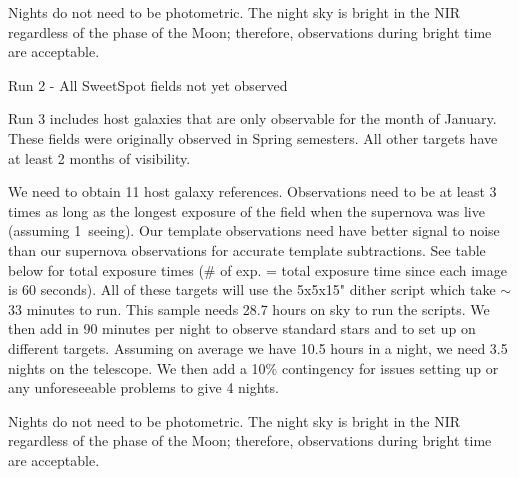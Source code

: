 \documentclass[11pt]{article}
\begin{document}
Nights do not need to be photometric. 
The night sky is bright in the NIR regardless of the phase of the Moon; therefore, observations during bright time are acceptable. 

\begin{configuration}
\grating{}
\order{}
\crossdisperser{}
\slit{}
\multislit{}
\wstart{}
\wend{}
\cable{}
\corrector{}
\collimator{}
\adc{}
\end{configuration}
\specialrequest    %
\begin{targettable}{Run 2 - All SweetSpot fields not yet observed}
\objid{}           %
\object{}          %
\ra{}              %
\dec{}             %
\epoch{}           %
\magnitude{}
\filter{}
\exptime{}         %
\nexposures{}      %
\moondays{}        %
\skycond{}         %
\seeing{}          %
\obscomment{}      %
\end{targettable}

\technicaldescription

Run 3 includes host galaxies that are only observable for the month of January. 
These fields were originally observed in Spring semesters. All other targets have at least 2 months of visibility.

We need to obtain 11 host galaxy references. 
Observations need to be at least 3 times as long as the longest exposure of the field when the supernova was live (assuming 1\arcsec\ seeing).
Our template observations need have better signal to noise than our supernova observations for accurate template subtractions. 
See table below for total exposure times ($\#$ of exp. = total exposure time since each image is 60 seconds).
All of these targets will use the 5x5x15" dither script which take $\sim$ 33 minutes to run. 
This sample needs 28.7 hours on sky to run the scripts. 
We then add in 90 minutes per night to observe standard stars and to set up on different targets. 
Assuming on average we have 10.5 hours in a night, we need 3.5 nights on the telescope. 
We then add a 10$\%$ contingency for issues setting up or any unforeseeable problems to give 4 nights. 

Nights do not need to be photometric. 
The night sky is bright in the NIR regardless of the phase of the Moon; therefore, observations during bright time are acceptable. 
\end{document}
